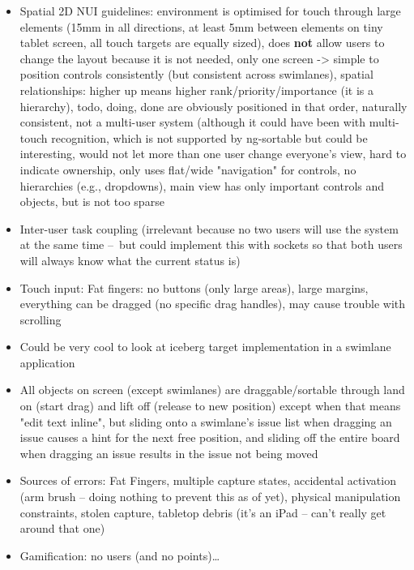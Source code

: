 \begin{itemize}
  \item Spatial 2D NUI guidelines: environment is optimised for touch through large elements (15mm in all directions, at least 5mm between elements on tiny tablet screen, all touch targets are equally sized), does \textbf{not} allow users to change the layout because it is not needed, only one screen -> simple to position controls consistently (but consistent across swimlanes), spatial relationships: higher up means higher rank/priority/importance (it is a hierarchy), todo, doing, done are obviously positioned in that order, naturally consistent, not a multi-user system (although it could have been with multi-touch recognition, which is not supported by ng-sortable but could be interesting, would not let more than one user change everyone's view, hard to indicate ownership, only uses flat/wide "navigation" for controls, no hierarchies (e.g., dropdowns), main view has only important controls and objects, but is not too sparse
  \item Inter-user task coupling (irrelevant because no two users will use the system at the same time – but could implement this with sockets so that both users will always know what the current status is)
  \item Touch input: Fat fingers: no buttons (only large areas), large margins, everything can be dragged (no specific drag handles), may cause trouble with scrolling
  \item Could be very cool to look at iceberg target implementation in a swimlane application %
  \item All objects on screen (except swimlanes) are draggable/sortable through land on (start drag) and lift off (release to new position) except when that means "edit text inline", but sliding onto a swimlane's issue list when dragging an issue causes a hint for the next free position, and sliding off the entire board when dragging an issue results in the issue not being moved %
  \item Sources of errors: Fat Fingers, multiple capture states, accidental activation (arm brush – doing nothing to prevent this as of yet), physical manipulation constraints, stolen capture, tabletop debris (it's an iPad – can't really get around that one)
  \item Gamification: no users (and no points)\dots %

\end{itemize}
